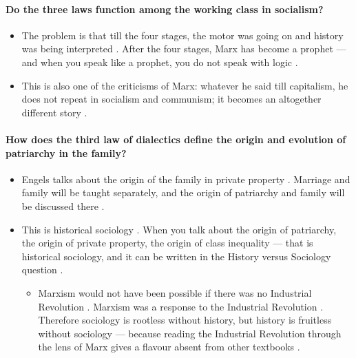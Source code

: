 \paragraph{Do the three laws function among the working class in socialism?}
\begin{itemize}
    \item The problem is that till the four stages, the motor was going on and history was being interpreted . After the four stages, Marx has become a prophet --- and when you speak like a prophet, you do not speak with logic .
    \item This is also one of the criticisms of Marx: whatever he said till capitalism, he does not repeat in socialism and communism; it becomes an altogether different story .
\end{itemize}

\paragraph{How does the third law of dialectics define the origin and evolution of patriarchy in the family?}
\begin{itemize}
    \item Engels talks about the origin of the family in private property . Marriage and family will be taught separately, and the origin of patriarchy and family will be discussed there .
    \item This is historical sociology . When you talk about the origin of patriarchy, the origin of private property, the origin of class inequality --- that is historical sociology, and it can be written in the History versus Sociology question .
    \begin{itemize}
        \item Marxism would not have been possible if there was no Industrial Revolution . Marxism was a response to the Industrial Revolution . Therefore sociology is rootless without history, but history is fruitless without sociology --- because reading the Industrial Revolution through the lens of Marx gives a flavour absent from other textbooks .
    \end{itemize}
\end{itemize}

